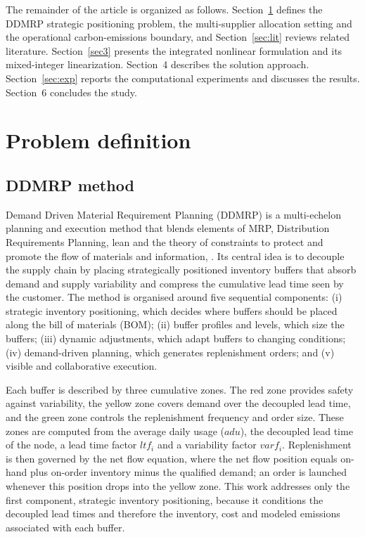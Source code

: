 \documentclass[preprint,12pt,authoryear]{elsarticle}
\begin{document}
The remainder of the article is organized as follows. Section~\ref{sec2} defines the DDMRP strategic positioning problem, the multi-supplier allocation setting and the operational carbon-emissions boundary, and Section~\ref{sec:lit} reviews related literature. Section~\ref{sec3} presents the integrated nonlinear formulation and its mixed-integer linearization. Section~4 describes the solution approach. Section~\ref{sec:exp} reports the computational experiments and discusses the results. Section~6 concludes the study.

\section{Problem definition}\label{sec2}
\subsection{DDMRP method}
Demand Driven Material Requirement Planning (DDMRP) is a multi-echelon planning and execution method that blends elements of MRP, Distribution Requirements Planning, lean and the theory of constraints to protect and promote the flow of materials and information, \citet{ptak2019}. Its central idea is to decouple the supply chain by placing strategically positioned inventory buffers that absorb demand and supply variability and compress the cumulative lead time seen by the customer. The method is organised around five sequential components: (i) strategic inventory positioning, which decides where buffers should be placed along the bill of materials (BOM); (ii) buffer profiles and levels, which size the buffers; (iii) dynamic adjustments, which adapt buffers to changing conditions; (iv) demand-driven planning, which generates replenishment orders; and (v) visible and collaborative execution.

Each buffer is described by three cumulative zones. The red zone provides safety against variability, the yellow zone covers demand over the decoupled lead time, and the green zone controls the replenishment frequency and order size. These zones are computed from the average daily usage ($adu$), the decoupled lead time of the node, a lead time factor $ltf_{i}$ and a variability factor $varf_{i}$. Replenishment is then governed by the net flow equation, where the net flow position equals on-hand plus on-order inventory minus the qualified demand; an order is launched whenever this position drops into the yellow zone. This work addresses only the first component, strategic inventory positioning, because it conditions the decoupled lead times and therefore the inventory, cost and modeled emissions associated with each buffer.
\end{document}
